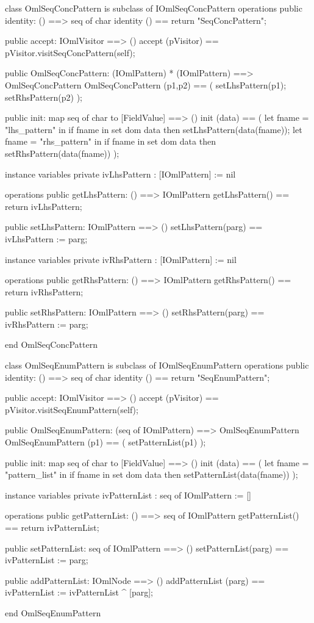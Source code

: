\begin{vdm_al}
class OmlSeqConcPattern is subclass of IOmlSeqConcPattern
operations
  public identity: () ==> seq of char
  identity () == return "SeqConcPattern";

  public accept: IOmlVisitor ==> ()
  accept (pVisitor) == pVisitor.visitSeqConcPattern(self);

  public OmlSeqConcPattern:
      (IOmlPattern) *
      (IOmlPattern) ==> OmlSeqConcPattern
  OmlSeqConcPattern (p1,p2) == 
   ( setLhsPattern(p1);
     setRhsPattern(p2) );

  public init: map seq of char to [FieldValue] ==> ()
  init (data) ==
    ( let fname = "lhs_pattern" in
        if fname in set dom data
        then setLhsPattern(data(fname));
      let fname = "rhs_pattern" in
        if fname in set dom data
        then setRhsPattern(data(fname)) );

instance variables
  private ivLhsPattern : [IOmlPattern] := nil

operations
  public getLhsPattern: () ==> IOmlPattern
  getLhsPattern() == return ivLhsPattern;

  public setLhsPattern: IOmlPattern ==> ()
  setLhsPattern(parg) == ivLhsPattern := parg;

instance variables
  private ivRhsPattern : [IOmlPattern] := nil

operations
  public getRhsPattern: () ==> IOmlPattern
  getRhsPattern() == return ivRhsPattern;

  public setRhsPattern: IOmlPattern ==> ()
  setRhsPattern(parg) == ivRhsPattern := parg;

end OmlSeqConcPattern
\end{vdm_al}

\begin{vdm_al}
class OmlSeqEnumPattern is subclass of IOmlSeqEnumPattern
operations
  public identity: () ==> seq of char
  identity () == return "SeqEnumPattern";

  public accept: IOmlVisitor ==> ()
  accept (pVisitor) == pVisitor.visitSeqEnumPattern(self);

  public OmlSeqEnumPattern:
      (seq of IOmlPattern) ==> OmlSeqEnumPattern
  OmlSeqEnumPattern (p1) == 
   ( setPatternList(p1) );

  public init: map seq of char to [FieldValue] ==> ()
  init (data) ==
    ( let fname = "pattern_list" in
        if fname in set dom data
        then setPatternList(data(fname)) );

instance variables
  private ivPatternList : seq of IOmlPattern := []

operations
  public getPatternList: () ==> seq of IOmlPattern
  getPatternList() == return ivPatternList;

  public setPatternList: seq of IOmlPattern ==> ()
  setPatternList(parg) == ivPatternList := parg;

  public addPatternList: IOmlNode ==> ()
  addPatternList (parg) == ivPatternList := ivPatternList ^ [parg];

end OmlSeqEnumPattern
\end{vdm_al}

